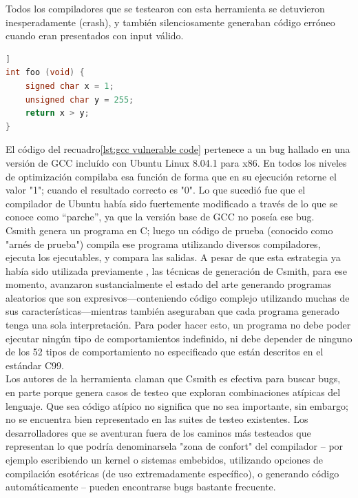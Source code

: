 Todos los compiladores que se testearon con esta herramienta se detuvieron inesperadamente (crash), y también silenciosamente generaban código erróneo cuando eran presentados con input válido.\\

\begin{lstlisting}[language={c}, label={lst:gcc vulnerable code}, caption={Código que produjo bug en GCC}, captionpos={b}, frame={shadowbox}]]
int foo (void) {
    signed char x = 1;
    unsigned char y = 255;
    return x > y;
}
\end{lstlisting}

El código del recuadro\ref{lst:gcc vulnerable code} pertenece a un bug hallado en una versión de GCC incluído con Ubuntu Linux 8.04.1 para x86. En todos los niveles de optimización compilaba esa función  de forma que en su ejecución retorne el valor "1"; cuando el resultado correcto es "0". Lo que sucedió fue que el compilador de Ubuntu había sido fuertemente modificado a través de lo que se conoce como “parche”, ya que la versión base de GCC no poseía ese bug\cite{Yang:2011:FUB:1993316.1993532}.\\

Csmith genera un programa en C; luego un código de prueba (conocido como "arnés de prueba") compila ese programa utilizando diversos compiladores, ejecuta los ejecutables, y compara las salidas. A pesar de que esta estrategia ya había sido utilizada previamente \cite{Eide:2008:VM:1450058.1450093}\cite{McKeeman98differentialtesting}\cite{Sheridan2007c99comparison}, las técnicas de generación de Csmith, para ese momento, avanzaron sustancialmente el estado del arte generando programas aleatorios que son expresivos—conteniendo código complejo utilizando muchas de sus características—mientras también aseguraban que cada programa generado tenga una sola interpretación. Para poder hacer esto, un programa no debe poder ejecutar ningún tipo de comportamientos indefinido, ni debe depender de ninguno de los 52 tipos de comportamiento no especificado que están descritos en el estándar C99\cite{openstdc99}.\\

Los autores de la herramienta claman que Csmith es efectiva para buscar bugs, en parte porque genera casos de testeo que exploran combinaciones atípicas del lenguaje. Que sea código atípico no significa que no sea importante, sin embargo; no se encuentra bien representado en las suites de testeo existentes. Los desarrolladores que se aventuran fuera de los caminos más testeados que representan lo que podría denominarsela "zona de confort" del compilador -- por ejemplo escribiendo un kernel o sistemas embebidos, utilizando opciones de compilación esotéricas (de uso extremadamente específico), o generando código automáticamente -- pueden encontrarse bugs bastante frecuente.\\

